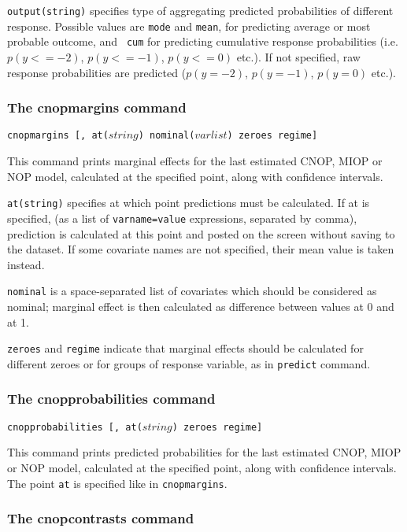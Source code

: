 \documentclass[letterpaper,fleqn,11pt]{article}
\begin{document}
\begin{onehalfspace}
\texttt{output(string)} specifies type of aggregating predicted
probabilities of different response. Possible values are \texttt{mode} and 
\texttt{mean}, for predicting average or most probable outcome, and \texttt{%
cum} for predicting cumulative response probabilities (i.e. $p(y <=-2)$, $%
p(y<=-1)$, $p(y<=0)$ etc.). If not specified, raw response probabilities are
predicted ($p(y=-2)$, $p(y=-1)$, $p(y=0)$ etc.).

\subsubsection*{The cnopmargins command}

\texttt{cnopmargins [, at($string$) nominal($varlist$) zeroes regime]}

This command prints marginal effects for the last estimated CNOP, MIOP or
NOP model, calculated at the specified point, along with confidence
intervals.

\texttt{at(string)} specifies at which point predictions must be calculated.
If at is specified, (as a list of \texttt{varname=value} expressions,
separated by comma), prediction is calculated at this point and posted on
the screen without saving to the dataset. If some covariate names are not
specified, their mean value is taken instead.

\texttt{nominal} is a space-separated list of covariates which should be
considered as nominal; marginal effect is then calculated as difference
between values at 0 and at 1.

\texttt{zeroes} and \texttt{regime} indicate that marginal effects should be
calculated for different zeroes or for groups of response variable, as in 
\texttt{predict} command.

\subsubsection*{The cnopprobabilities command}

\texttt{cnopprobabilities [, at($string$) zeroes regime]}

This command prints predicted probabilities for the last estimated CNOP,
MIOP or NOP model, calculated at the specified point, along with confidence
intervals. The point \texttt{at} is specified like in \texttt{cnopmargins}.

\subsubsection*{The cnopcontrasts command}


\end{onehalfspace}
\end{document}
